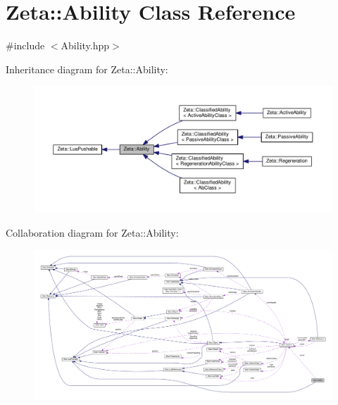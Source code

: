 \hypertarget{classZeta_1_1Ability}{\section{Zeta\+:\+:Ability Class Reference}
\label{classZeta_1_1Ability}
}


{\ttfamily \#include $<$Ability.\+hpp$>$}



Inheritance diagram for Zeta\+:\+:Ability\+:\nopagebreak
\begin{figure}[H]
\begin{center}
\leavevmode
\includegraphics[width=350pt]{classZeta_1_1Ability__inherit__graph}
\end{center}
\end{figure}


Collaboration diagram for Zeta\+:\+:Ability\+:
\nopagebreak
\begin{figure}[H]
\begin{center}
\leavevmode
\includegraphics[width=350pt]{classZeta_1_1Ability__coll__graph}
\end{center}
\end{figure}
